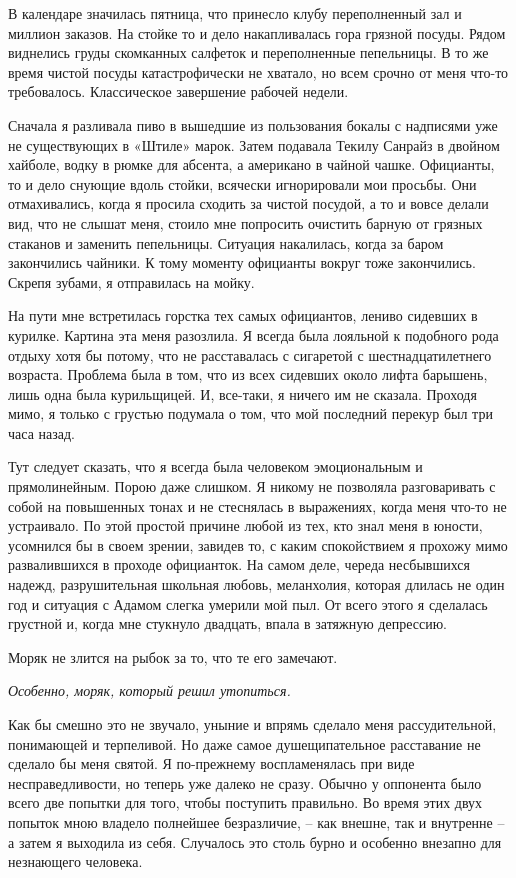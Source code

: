 \documentclass[
]{book}
\begin{document}
В календаре значилась пятница, что принесло клубу переполненный зал и миллион заказов. На стойке то и дело накапливалась гора грязной посуды. Рядом виднелись груды скомканных салфеток и переполненные пепельницы. В то же время чистой посуды катастрофически не хватало, но всем срочно от меня что-то требовалось. Классическое завершение рабочей недели.

Сначала я разливала пиво в вышедшие из пользования бокалы с надписями уже не существующих в «Штиле» марок. Затем подавала Текилу Санрайз в двойном хайболе, водку в рюмке для абсента, а американо в чайной чашке. Официанты, то и дело снующие вдоль стойки, всячески игнорировали мои просьбы. Они отмахивались, когда я просила сходить за чистой посудой, а то и вовсе делали вид, что не слышат меня, стоило мне попросить очистить барную от грязных стаканов и заменить пепельницы. Ситуация накалилась, когда за баром закончились чайники. К тому моменту официанты вокруг тоже закончились. Скрепя зубами, я отправилась на мойку.

На пути мне встретилась горстка тех самых официантов, лениво сидевших в курилке. Картина эта меня разозлила. Я всегда была лояльной к подобного рода отдыху хотя бы потому, что не расставалась с сигаретой с шестнадцатилетнего возраста. Проблема была в том, что из всех сидевших около лифта барышень, лишь одна была курильщицей. И, все-таки, я ничего им не сказала. Проходя мимо, я только с грустью подумала о том, что мой последний перекур был три часа назад.

Тут следует сказать, что я всегда была человеком эмоциональным и прямолинейным. Порою даже слишком. Я никому не позволяла разговаривать с собой на повышенных тонах и не стеснялась в выражениях, когда меня что-то не устраивало. По этой простой причине любой из тех, кто знал меня в юности, усомнился бы в своем зрении, завидев то, с каким спокойствием я прохожу мимо развалившихся в проходе официанток. На самом деле, череда несбывшихся надежд, разрушительная школьная любовь, меланхолия, которая длилась не один год и ситуация с Адамом слегка умерили мой пыл. От всего этого я сделалась грустной и, когда мне стукнуло двадцать, впала в затяжную депрессию.

Моряк не злится на рыбок за то, что те его замечают.

\emph{Особенно, моряк, который решил утопиться.}

Как бы смешно это не звучало, уныние и впрямь сделало меня рассудительной, понимающей и терпеливой. Но даже самое душещипательное расставание не сделало бы меня святой. Я по-прежнему воспламенялась при виде несправедливости, но теперь уже далеко не сразу. Обычно у оппонента было всего две попытки для того, чтобы поступить правильно. Во время этих двух попыток мною владело полнейшее безразличие, -- как внешне, так и внутренне -- а затем я выходила из себя. Случалось это столь бурно и особенно внезапно для незнающего человека.
\end{document}

